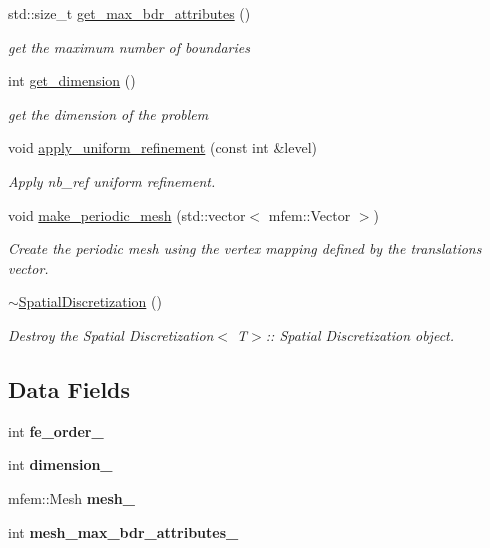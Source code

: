 \begin{DoxyCompactItemize}
std\+::size\+\_\+t \hyperlink{classSpatialDiscretization_aa6fe6ae45f18daf5a20fbc8b49b2ef05}{get\+\_\+max\+\_\+bdr\+\_\+attributes} ()
\begin{DoxyCompactList}\small\item\em get the maximum number of boundaries \end{DoxyCompactList}\item 
int \hyperlink{classSpatialDiscretization_a8d69dd3c7e36327396e626b27d98f96f}{get\+\_\+dimension} ()
\begin{DoxyCompactList}\small\item\em get the dimension of the problem \end{DoxyCompactList}\item 
void \hyperlink{classSpatialDiscretization_a3463c09a77a0c6563a353d97cf56dfa4}{apply\+\_\+uniform\+\_\+refinement} (const int \&level)
\begin{DoxyCompactList}\small\item\em Apply nb\+\_\+ref uniform refinement. \end{DoxyCompactList}\item 
void \hyperlink{classSpatialDiscretization_a4b88c0c7dbdb10a8d1442e599ac9a831}{make\+\_\+periodic\+\_\+mesh} (std\+::vector$<$ mfem\+::\+Vector $>$)
\begin{DoxyCompactList}\small\item\em Create the periodic mesh using the vertex mapping defined by the translations vector. \end{DoxyCompactList}\item 
\hyperlink{classSpatialDiscretization_a67d6d572cea0c15e063386b7bf0e8149}{$\sim$\+Spatial\+Discretization} ()
\begin{DoxyCompactList}\small\item\em Destroy the Spatial Discretization$<$ T$>$\+:\+: Spatial Discretization object. \end{DoxyCompactList}\end{DoxyCompactItemize}
\subsection*{Data Fields}
\begin{DoxyCompactItemize}
\item 
\mbox{\label{classSpatialDiscretization_a66ab29632eebb06fb2948c86a218e5cf}} 
int {\bfseries fe\+\_\+order\+\_\+}
\item 
\mbox{\label{classSpatialDiscretization_a0e7531dafb21802dae022cbb71533ecd}} 
int {\bfseries dimension\+\_\+}
\item 
\mbox{\label{classSpatialDiscretization_add1c5e5e4ff23e7d62f0e7fc7c6fd85c}} 
mfem\+::\+Mesh {\bfseries mesh\+\_\+}
\item 
\mbox{\label{classSpatialDiscretization_af206f17ba4eae7d9eb056183130a01b7}} 
int {\bfseries mesh\+\_\+max\+\_\+bdr\+\_\+attributes\+\_\+}
\end{DoxyCompactItemize}


